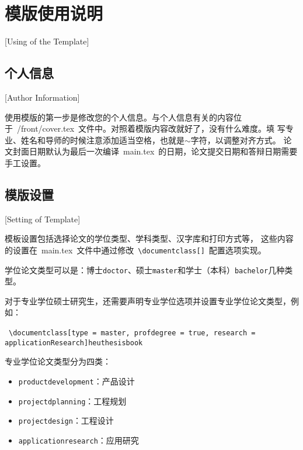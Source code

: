 
%
%
%

\chapter{模版使用说明}[Using of the Template]
\label{chap03}

\section{个人信息}[Author Information]

使用模版的第一步是修改您的个人信息。与个人信息有关的内容位
于~{/front/cover.tex}~文件中。对照着模版内容改就好了，没有什么难度。填
写专业、姓名和导师的时候注意添加适当空格，也就是$\sim$字符，以调整对齐方式。
论文封面日期默认为最后一次编译~main.tex~的日期，论文提交日期和答辩日期需要手工设置。

\section{模版设置}[Setting of Template]

模板设置包括选择论文的学位类型、学科类型、汉字库和打印方式等，
这些内容的设置在~main.tex~文件中通过修改~\texttt{\textbackslash documentclass[]}~配置选项实现。

学位论文类型可以是：博士\texttt{doctor}、硕士\texttt{master}和学士（本科）\texttt{bachelor}几种类型。

对于专业学位硕士研究生，还需要声明专业学位选项并设置专业学位论文类型，例如：

~\texttt{\textbackslash documentclass[type = master, profdegree = true, research = applicationResearch]{heuthesisbook}}

专业学位论文类型分为四类：
\begin{itemize}
  \item \texttt{productdevelopment}：产品设计
  \item \texttt{projectdplanning}：工程规划
  \item \texttt{projectdesign}：工程设计
  \item \texttt{applicationresearch}：应用研究
\end{itemize}

